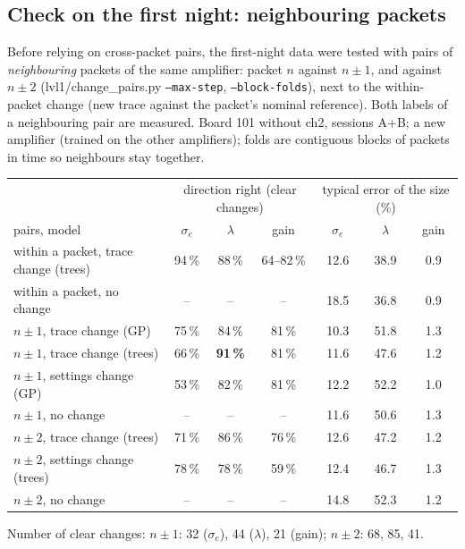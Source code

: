 \subsection{Check on the first night: neighbouring packets}
Before relying on cross-packet pairs, the first-night data were tested with pairs of \emph{neighbouring} packets of the
same amplifier: packet $n$ against $n\pm1$, and against $n\pm2$ (lvl1/change\_pairs.py \texttt{--max-step},
\texttt{--block-folds}), next to the within-packet change (new trace against the packet's nominal reference). Both
labels of a neighbouring pair are measured. Board 101 without ch2, sessions A+B; a new amplifier (trained on the other
amplifiers); folds are contiguous blocks of packets in time so neighbours stay together.

\begin{center}\small
\begin{tabular}{lcccccc}\toprule
 & \multicolumn{3}{c}{direction right (clear changes)} & \multicolumn{3}{c}{typical error of the size (\%)}\\
pairs, model & $\sigma_e$ & $\lambda$ & gain & $\sigma_e$ & $\lambda$ & gain\\\midrule
within a packet, trace change (trees) & 94\,\% & 88\,\% & 64--82\,\% & 12.6 & 38.9 & 0.9\\
within a packet, no change & -- & -- & -- & 18.5 & 36.8 & 0.9\\\midrule
$n\pm1$, trace change (GP) & 75\,\% & 84\,\% & 81\,\% & 10.3 & 51.8 & 1.3\\
$n\pm1$, trace change (trees) & 66\,\% & \textbf{91\,\%} & 81\,\% & 11.6 & 47.6 & 1.2\\
$n\pm1$, settings change (GP) & 53\,\% & 82\,\% & 81\,\% & 12.2 & 52.2 & 1.0\\
$n\pm1$, no change & -- & -- & -- & 11.6 & 50.6 & 1.3\\\midrule
$n\pm2$, trace change (trees) & 71\,\% & 86\,\% & 76\,\% & 12.6 & 47.2 & 1.2\\
$n\pm2$, settings change (trees) & 78\,\% & 78\,\% & 59\,\% & 12.4 & 46.7 & 1.3\\
$n\pm2$, no change & -- & -- & -- & 14.8 & 52.3 & 1.2\\\bottomrule
\end{tabular}
\end{center}
Number of clear changes: $n\pm1$: 32 ($\sigma_e$), 44 ($\lambda$), 21 (gain); $n\pm2$: 68, 85, 41.

